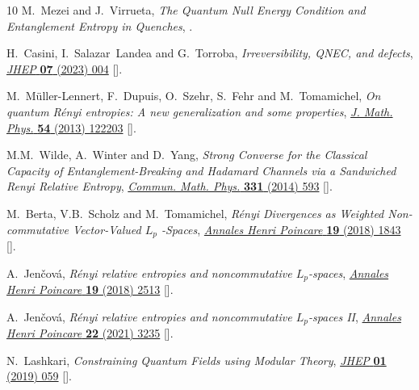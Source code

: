 \documentclass[11pt,a4paper]{article}
\theoremstyle{plain}
\numberwithin{theorem}{section}
\theoremstyle{definition}
\newcommand{\?}{\overset{?}{=}}
\begin{document}
\begin{thebibliography}{10}
M.~Mezei and J.~Virrueta, \emph{{The Quantum Null Energy Condition and
  Entanglement Entropy in Quenches}},
  \href{https://arxiv.org/abs/1909.00919}{{}}.

H.~Casini, I.~Salazar~Landea and G.~Torroba, \emph{{Irreversibility, QNEC, and
  defects}}, \href{https://doi.org/10.1007/JHEP07(2023)004}{\emph{JHEP}
  {\bfseries 07} (2023) 004}
  [\href{https://arxiv.org/abs/2303.16935}{{}}].

M.~M{\"u}ller-Lennert, F.~Dupuis, O.~Szehr, S.~Fehr and M.~Tomamichel,
  \emph{{On quantum R{\'e}nyi entropies: A new generalization and some
  properties}}, \href{https://doi.org/10.1063/1.4838856}{\emph{J. Math. Phys.}
  {\bfseries 54} (2013) 122203}
  [\href{https://arxiv.org/abs/1306.3142}{{}}].

M.M.~Wilde, A.~Winter and D.~Yang, \emph{{Strong Converse for the Classical
  Capacity of Entanglement-Breaking and Hadamard Channels via a Sandwiched
  Renyi Relative Entropy}},
  \href{https://doi.org/10.1007/s00220-014-2122-x}{\emph{Commun. Math. Phys.}
  {\bfseries 331} (2014) 593}
  [\href{https://arxiv.org/abs/1306.1586}{{}}].

M.~Berta, V.B.~Scholz and M.~Tomamichel, \emph{{R\'enyi Divergences as Weighted
  Non-commutative Vector-Valued $L_p$ -Spaces}},
  \href{https://doi.org/10.1007/s00023-018-0670-x}{\emph{Annales Henri
  Poincare} {\bfseries 19} (2018) 1843}
  [\href{https://arxiv.org/abs/1608.05317}{{}}].

A.~Jen\v{c}ov\'a, \emph{{R{\'e}nyi relative entropies and noncommutative
  $L_p$-spaces}},
  \href{https://doi.org/10.1007/s00023-018-0683-5}{\emph{Annales Henri
  Poincare} {\bfseries 19} (2018) 2513}
  [\href{https://arxiv.org/abs/1609.08462}{{}}].

A.~Jen\v{c}ov\'a, \emph{{R\'enyi relative entropies and noncommutative
  $L_p$-spaces II}},
  \href{https://doi.org/10.1007/s00023-021-01074-9}{\emph{Annales Henri
  Poincare} {\bfseries 22} (2021) 3235}
  [\href{https://arxiv.org/abs/1707.00047}{{}}].

N.~Lashkari, \emph{{Constraining Quantum Fields using Modular Theory}},
  \href{https://doi.org/10.1007/JHEP01(2019)059}{\emph{JHEP} {\bfseries 01}
  (2019) 059} [\href{https://arxiv.org/abs/1810.09306}{{}}].


\end{thebibliography}
\end{document}
